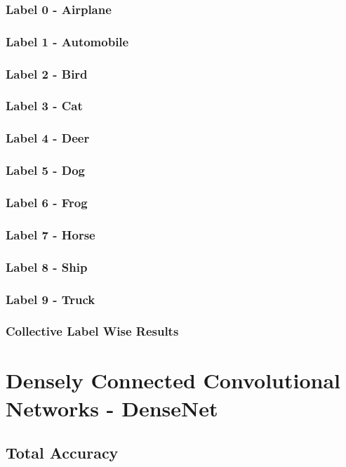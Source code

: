 \subsubsection{Label 0 - Airplane}
\subsubsection{Label 1 - Automobile}
\subsubsection{Label 2 - Bird}
\subsubsection{Label 3 - Cat}
\subsubsection{Label 4 - Deer}
\subsubsection{Label 5 - Dog}
\subsubsection{Label 6 - Frog}
\subsubsection{Label 7 - Horse}
\subsubsection{Label 8 - Ship}
\subsubsection{Label 9 - Truck}
\subsubsection{Collective Label Wise Results}

\section{Densely Connected Convolutional Networks - DenseNet}

\subsection{Total Accuracy}
